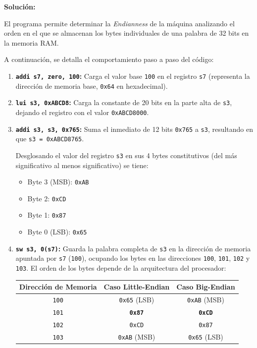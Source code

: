 \documentclass[letterpaper,12pt]{article}
\begin{document}
\begin{enumerate}
    \color{solcolor}
    \textbf{Solución:}
    
    El programa permite determinar la \textit{Endianness} de la máquina analizando el orden en el que se almacenan los bytes individuales de una palabra de 32 bits en la memoria RAM.
    
    A continuación, se detalla el comportamiento paso a paso del código:
    \begin{enumerate}[label=\arabic*)]
        \item \textbf{\texttt{addi s7, zero, 100}:} Carga el valor base \texttt{100} en el registro \texttt{s7} (representa la dirección de memoria base, \texttt{0x64} en hexadecimal).
        \item \textbf{\texttt{lui s3, 0xABCD8}:} Carga la constante de 20 bits en la parte alta de \texttt{s3}, dejando el registro con el valor \texttt{0xABCD8000}.
        \item \textbf{\texttt{addi s3, s3, 0x765}:} Suma el inmediato de 12 bits \texttt{0x765} a \texttt{s3}, resultando en que \texttt{s3 = 0xABCD8765}.
        
        Desglosando el valor del registro \texttt{s3} en sus 4 bytes constitutivos (del más significativo al menos significativo) se tiene:
        \begin{itemize}[noitemsep]
            \item Byte 3 (MSB): \texttt{0xAB}
            \item Byte 2: \texttt{0xCD}
            \item Byte 1: \texttt{0x87}
            \item Byte 0 (LSB): \texttt{0x65}
        \end{itemize}
        
        \item \textbf{\texttt{sw s3, 0(s7)}:} Guarda la palabra completa de \texttt{s3} en la dirección de memoria apuntada por \texttt{s7} (\texttt{100}), ocupando los bytes en las direcciones \texttt{100}, \texttt{101}, \texttt{102} y \texttt{103}. El orden de los bytes depende de la arquitectura del procesador:
        
        \begin{table}[H]
            \centering
            \small
            \begin{tabular}{|c|c|c|}
                \hline
                \textbf{Dirección de Memoria} & \textbf{Caso Little-Endian} & \textbf{Caso Big-Endian} \\
                \hline
                \texttt{100} & \texttt{0x65} (LSB) & \texttt{0xAB} (MSB) \\
                \hline
                \texttt{101} & \textbf{\texttt{0x87}} & \textbf{\texttt{0xCD}} \\
                \hline
                \texttt{102} & \texttt{0xCD} & \texttt{0x87} \\
                \hline
                \texttt{103} & \texttt{0xAB} (MSB) & \texttt{0x65} (LSB) \\
                \hline
            \end{tabular}
        \end{table}


\end{enumerate}
\end{enumerate}
\end{document}
